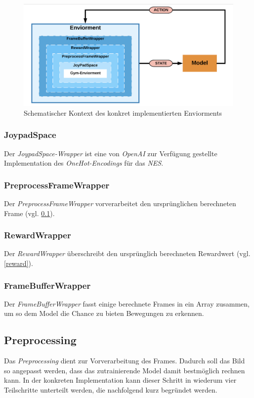 \documentclass[sigconf,nonacm]{acmart}
\begin{document}
\begin{figure}[hbt!]
\includegraphics[width=\columnwidth]{env_context.png}
\caption{Schematischer Kontext des konkret implementierten Enviorments}
\end{figure}

\subsubsection{JoypadSpace}\hfill \break
Der \textit{JoypadSpace-Wrapper} ist eine von \textit{OpenAI} zur Verfügung gestellte Implementation des \textit{OneHot-Encodings} für das \textit{NES}.

\subsubsection{PreprocessFrameWrapper}\hfill \break
Der \textit{PreprocessFrameWrapper} vorverarbeitet den ursprünglichen berechneten Frame (vgl. \ref{preprocessing}).

\subsubsection{RewardWrapper}\hfill \break
Der \textit{RewardWrapper} überschreibt den ursprünglich berechneten Rewardwert (vgl. \ref{reward}).

\subsubsection{FrameBufferWrapper}\hfill \break
Der \textit{FrameBufferWrapper} fasst einige berechnete Frames in ein Array zusammen, um so dem Model die Chance zu bieten Bewegungen zu erkennen.

\subsection{Preprocessing}
\label{preprocessing}
Das \textit{Preprocessing} dient zur Vorverarbeitung des Frames. Dadurch soll das Bild so angepasst werden, dass das zutrainierende Model damit bestmöglich rechnen kann. In der konkreten Implementation kann dieser Schritt in wiederum vier Teilschritte unterteilt werden, die nachfolgend kurz begründet werden.
\end{document}

